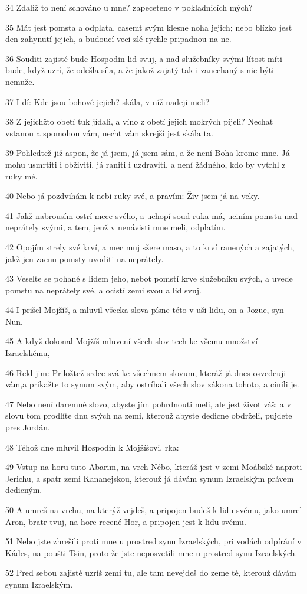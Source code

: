 \par 34 Zdaliž to není schováno u mne? zapeceteno v pokladnicích mých?
\par 35 Mát jest pomsta a odplata, casemt svým klesne noha jejich; nebo blízko jest den zahynutí jejich, a budoucí veci zlé rychle pripadnou na ne.
\par 36 Souditi zajisté bude Hospodin lid svuj, a nad služebníky svými lítost míti bude, když uzrí, že odešla síla, a že jakož zajatý tak i zanechaný s nic býti nemuže.
\par 37 I dí: Kde jsou bohové jejich? skála, v níž nadeji meli?
\par 38 Z jejichžto obetí tuk jídali, a víno z obetí jejich mokrých píjeli? Nechat vstanou a spomohou vám, necht vám skrejší jest skála ta.
\par 39 Pohledtež již aspon, že já jsem, já jsem sám, a že není Boha krome mne. Já mohu usmrtiti i obživiti, já raniti i uzdraviti, a není žádného, kdo by vytrhl z ruky mé.
\par 40 Nebo já pozdvihám k nebi ruky své, a pravím: Živ jsem já na veky.
\par 41 Jakž nabrousím ostrí mece svého, a uchopí soud ruka má, uciním pomstu nad neprátely svými, a tem, jenž v nenávisti mne meli, odplatím.
\par 42 Opojím strely své krví, a mec muj sžere maso, a to krví ranených a zajatých, jakž jen zacnu pomsty uvoditi na neprátely.
\par 43 Veselte se pohané s lidem jeho, nebot pomstí krve služebníku svých, a uvede pomstu na neprátely své, a ocistí zemi svou a lid svuj.
\par 44 I prišel Mojžíš, a mluvil všecka slova písne této v uši lidu, on a Jozue, syn Nun.
\par 45 A když dokonal Mojžíš mluvení všech slov tech ke všemu množství Izraelskému,
\par 46 Rekl jim: Priložtež srdce svá ke všechnem slovum, kteráž já dnes osvedcuji vám,a prikažte to synum svým, aby ostríhali všech slov zákona tohoto, a cinili je.
\par 47 Nebo není daremné slovo, abyste jím pohrdnouti meli, ale jest život váš; a v slovu tom prodlíte dnu svých na zemi, kterouž abyste dedicne obdrželi, pujdete pres Jordán.
\par 48 Téhož dne mluvil Hospodin k Mojžíšovi, rka:
\par 49 Vstup na horu tuto Abarim, na vrch Nébo, kteráž jest v zemi Moábské naproti Jerichu, a spatr zemi Kananejskou, kterouž já dávám synum Izraelským právem dedicným.
\par 50 A umreš na vrchu, na kterýž vejdeš, a pripojen budeš k lidu svému, jako umrel Aron, bratr tvuj, na hore recené Hor, a pripojen jest k lidu svému.
\par 51 Nebo jste zhrešili proti mne u prostred synu Izraelských, pri vodách odpírání v Kádes, na poušti Tsin, proto že jste neposvetili mne u prostred synu Izraelských.
\par 52 Pred sebou zajisté uzríš zemi tu, ale tam nevejdeš do zeme té, kterouž dávám synum Izraelským.

